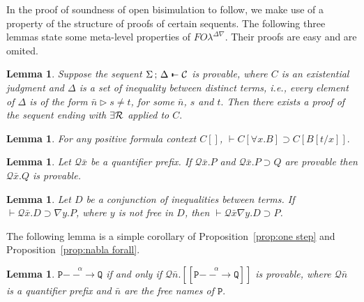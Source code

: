 \documentclass{acmtrans2m}
\newtheorem{lemma}[theorem]{Lemma}
\newcommand{\ie}{{\em i.e.}}
\def\Cscr{{\mathcal C}}
\def\Qscr{{\mathcal Q}}
\def\Ppi{{\mathtt P}}
\def\Qpi{{\mathtt Q}}
\def\relbar{\mathrel{\smash-}}
\def\joinrelm{\mathrel{\mkern-3.2mu}}
\def\tailpiece{\kern 1pt\vrule height 1ex width 0.3ex depth -.25ex}
\def\seqsym{\mathrel{\tailpiece\joinrelm\relbar}}
\newcommand{\FOL   }{FO\lambda}
\newcommand{\FOLDNb}{\FOL^{\Delta\nabla}}
\newcommand{\Judg}[2]{#1\triangleright#2}
\newcommand{\NSeq}[3]{#1\,;\,#2 \seqsym #3}
\newcommand{\existsR}{\exists{\cal R}}
\newcommand{\oimp}{\supset}
\newcommand{\one  }[3]{#1\stackrel{#2}{-\!\!-\!\!\!\rightarrow    } #3}
\newcommand{\trans}[1]{[\![ #1 ]\!]}
\begin{document}
In the proof of soundness of open bisimulation to follow, we make use of
a property of the structure of proofs of certain sequents. 
The following three lemmas state some meta-level properties of $\FOLDNb$.
Their proofs are easy and are omited.

\begin{lemma}
\label{lm:distinction}
Suppose the sequent $\NSeq{\Sigma}{\Delta}{\Cscr}$ is provable, where $C$ is an existential
judgment and $\Delta$ is a set of inequality between distinct terms, \ie, every element of
$\Delta$ is of the form $\Judg{\bar n}{s \not = t}$, for some $\bar n$, $s$ and $t.$
Then there exists a proof of the sequent ending with $\existsR$ applied to $C.$
\end{lemma}

\begin{lemma}
\label{lm:context}
For any positive formula context $C[]$, $\vdash C[\forall x.B] \oimp C[B[t/x]].$ 
\end{lemma}

\begin{lemma}
\label{lm:modus ponens}
Let $\Qscr \bar x$ be a quantifier prefix. 
If $\Qscr \bar x. P$ and 
$\Qscr \bar x. P \oimp Q$ are provable 
then $\Qscr \bar x. Q$ is provable.
\end{lemma}


\begin{lemma}
\label{lm:nabla distinction}
Let $D$ be a conjunction of inequalities between terms.
If $\vdash \Qscr \bar x.D \oimp \nabla y. P$, where $y$ is not free in $D$, 
then  $\vdash \Qscr \bar x \nabla y. D \oimp P$.
\end{lemma}


The following lemma is a simple corollary of Proposition~\ref{prop:one step}
and Proposition~\ref{prop:nabla forall}.
\begin{lemma}
\label{lm:mixed prefix one step}
$\one{\Ppi}{\alpha}{\Qpi}$ if and only if $\Qscr \bar n.\trans{\one{\Ppi}{\alpha}{\Qpi}}$
is provable, where $\Qscr \bar n$ is a quantifier prefix and $\bar n$ are the free names of $\Ppi.$
\end{lemma}
\end{document}
